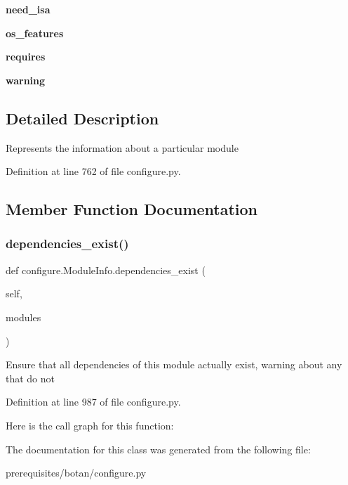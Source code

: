 \begin{DoxyCompactItemize}
{\bfseries need\+\_\+isa}
\item 
\mbox{\label{classconfigure_1_1_module_info_a46b96a964e021f14f7ba29ff08d21b97}} 
{\bfseries os\+\_\+features}
\item 
\mbox{\label{classconfigure_1_1_module_info_adc70258d0325f5fba529a04e2daf82c9}} 
{\bfseries requires}
\item 
\mbox{\label{classconfigure_1_1_module_info_af15ff54310a0264f69965a32b240bdf7}} 
{\bfseries warning}
\end{DoxyCompactItemize}


\subsection{Detailed Description}
\begin{DoxyVerb}Represents the information about a particular module
\end{DoxyVerb}
 

Definition at line 762 of file configure.\+py.



\subsection{Member Function Documentation}
\mbox{\label{classconfigure_1_1_module_info_a256a954aacfc4cf41ffce0797192819d}} 
\subsubsection{\texorpdfstring{dependencies\+\_\+exist()}{dependencies\_exist()}}
{\footnotesize\ttfamily def configure.\+Module\+Info.\+dependencies\+\_\+exist (\begin{DoxyParamCaption}\item[{}]{self,  }\item[{}]{modules }\end{DoxyParamCaption})}

\begin{DoxyVerb}Ensure that all dependencies of this module actually exist, warning
about any that do not
\end{DoxyVerb}
 

Definition at line 987 of file configure.\+py.

Here is the call graph for this function\+:


The documentation for this class was generated from the following file\+:\begin{DoxyCompactItemize}
\item 
prerequisites/botan/configure.\+py\end{DoxyCompactItemize}
